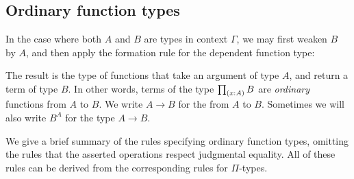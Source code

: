\subsection{Ordinary function types}
In the case where both $A$ and $B$ are types in context $\Gamma$, we may first weaken $B$ by $A$, and then apply the formation rule for the dependent function type:
\begin{prooftree}
\end{prooftree}
The result is the type of functions that take an argument of type $A$, and return a term of type $B$. In other words, terms of the type $\prd{x:A}B$ are \emph{ordinary} functions from $A$ to $B$. We write $A\to B$ for the  from $A$ to $B$. Sometimes we will also write $B^A$ for the type $A\to B$.

We give a brief summary of the rules specifying ordinary function types, omitting the rules that the asserted operations respect judgmental equality. All of these rules can be derived from the corresponding rules for $\Pi$-types.
\begin{prooftree}
\end{prooftree}%
\begin{prooftree}
\end{prooftree}%
\begin{prooftree}
\end{prooftree}%
\begin{prooftree}
\end{prooftree}%
\begin{prooftree}
\end{prooftree}

